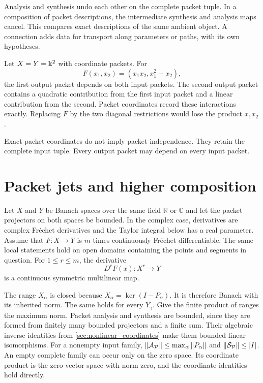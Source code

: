 \begin{keyidea}[title={Exactness by cancellation}]
Analysis and synthesis undo each other on the complete packet tuple. In a composition of packet descriptions, the intermediate synthesis and analysis maps cancel. This compares exact descriptions of the same ambient object. A connection adds data for transport along parameters or paths, with its own hypotheses.
\end{keyidea}

\begin{example}\label{ex:mixed_quadratic}
Let $X=Y=\Bbbk^2$ with coordinate packets.  For
\[
F(x_1,x_2)=(x_1x_2,x_1^2+x_2),
\]
the first output packet depends on both input packets.  The second output packet contains a quadratic contribution from the first input packet and a linear contribution from the second.  Packet coordinates record these interactions exactly.  Replacing $F$ by the two diagonal restrictions would lose the product $x_1x_2$.
\end{example}

\begin{remark}\label{rem:coordinates_not_independence}
Exact packet coordinates do not imply packet independence.  They retain the complete input tuple.  Every output packet may depend on every input packet.
\end{remark}

\section{Packet jets and higher composition}\label{sec:packet_jets}

Let $X$ and $Y$ be Banach spaces over the same field $\mathbb R$ or $\mathbb C$ and let the packet projectors on both spaces be bounded. In the complex case, derivatives are complex Fr\'echet derivatives and the Taylor integral below has a real parameter. Assume that $F:X\to Y$ is $m$ times continuously Fr\'echet differentiable. The same local statements hold on open domains containing the points and segments in question. For $1\le r\le m$, the derivative
\[
D^rF(x):X^r\longrightarrow Y
\]
is a continuous symmetric multilinear map.

The range $X_\alpha$ is closed because
$X_\alpha=\ker(I-P_\alpha)$. It is therefore Banach with its inherited norm. The same holds for every $Y_\gamma$. Give the finite product of ranges the maximum norm. Packet analysis and synthesis are bounded, since they are formed from finitely many bounded projectors and a finite sum. Their algebraic inverse identities from \cref{sec:nonlinear_coordinates} make them bounded linear isomorphisms. For a nonempty input family,
$\|\mathcal A_{\mathcal P}\|\le\max_\alpha\|P_\alpha\|$ and
$\|\mathcal S_{\mathcal P}\|\le |I|$. An empty complete family can occur only on the zero space. Its coordinate product is the zero vector space with norm zero, and the coordinate identities hold directly.

